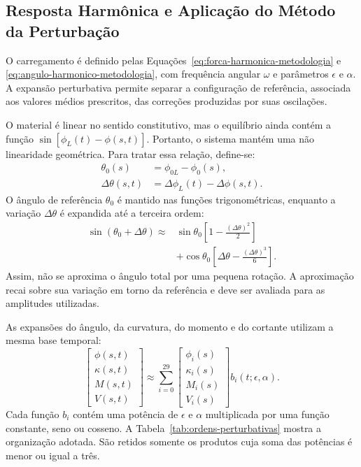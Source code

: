 \documentclass[arial,centeredequations,english,brazilian,oneside,section=TITLE]{ifes8}
\begin{document}
\subsection{Resposta Harmônica e Aplicação do Método da Perturbação}
\label{sec:aplicacao-metodo-perturbacao}

O carregamento é definido pelas
Equações~\eqref{eq:forca-harmonica-metodologia} e
\eqref{eq:angulo-harmonico-metodologia}, com frequência angular $\omega$ e
parâmetros $\epsilon$ e $\alpha$. A expansão perturbativa permite separar a
configuração de referência, associada aos valores médios prescritos, das
correções produzidas por suas oscilações.

O material é linear no sentido constitutivo, mas o equilíbrio ainda contém a
função $\sin[\phi_L(t)-\phi(s,t)]$. Portanto, o sistema mantém uma não
linearidade geométrica. Para tratar essa relação, define-se:
\begin{align}
  \theta_0(s)&=\phi_{0L}-\phi_0(s),
    \label{eq:angulo-relativo-referencia}\\
  \Delta\theta(s,t)&=\Delta\phi_L(t)-\Delta\phi(s,t).
    \label{eq:perturbacao-angulo-relativo}
\end{align}
O ângulo de referência $\theta_0$ é mantido nas funções trigonométricas, enquanto
a variação $\Delta\theta$ é expandida até a terceira ordem:
\begin{equation}
  \begin{aligned}
    \sin(\theta_0+\Delta\theta)\approx{}&
      \sin\theta_0\left[1-\frac{(\Delta\theta)^2}{2}\right]\\
      &+\cos\theta_0\left[\Delta\theta-\frac{(\Delta\theta)^3}{6}\right].
  \end{aligned}
  \label{eq:taylor-angulo-relativo}
\end{equation}
Assim, não se aproxima o ângulo total por uma pequena rotação. A aproximação
recai sobre sua variação em torno da referência e deve ser avaliada para as
amplitudes utilizadas.

As expansões do ângulo, da curvatura, do momento e do cortante utilizam a mesma
base temporal:
\begin{equation}
  \begin{bmatrix}\phi(s,t)\\ \kappa(s,t)\\ M(s,t)\\ V(s,t)\end{bmatrix}
  \approx\sum_{i=0}^{29}
  \begin{bmatrix}\phi_i(s)\\ \kappa_i(s)\\ M_i(s)\\ V_i(s)\end{bmatrix}
  b_i(t;\epsilon,\alpha).
  \label{eq:base-perturbativa-sistema}
\end{equation}
Cada função $b_i$ contém uma potência de $\epsilon$ e $\alpha$ multiplicada
por uma função constante, seno ou cosseno. A Tabela~\ref{tab:ordens-perturbativas}
mostra a organização adotada. São retidos somente os produtos cuja soma das
potências é menor ou igual a três.
\end{document}

